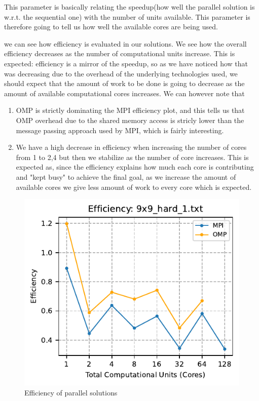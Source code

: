 This parameter is basically relating the speedup(how well the parallel solution is w.r.t. the sequential one) with the number of units available. This parameter is therefore going to tell us how well the available cores are being used.

 we can see how efficiency is evaluated in our solutions. We see how the overall efficiency decreases as the number of computational units increase. This is expected: efficiency is a mirror of the speedup, so as we have noticed how that was decreasing due to the overhead of the underlying technologies used, we should expect that the amount of work to be done is going to decrease as the amount of available computational cores increases. We can however note that 
\begin{enumerate}
    \item OMP is strictly dominating the MPI efficiency plot, and this tells us that OMP overhead due to the shared memory access is stricly lower than the message passing approach used by MPI, which is fairly interesting. 
    \item We have a high decrease in efficiency when increasing the number of cores from 1 to 2,4 but then we stabilize as the number of core increases. This is expected as, since the efficiency explains how much each core is contributing and "kept busy" to achieve the final goal, as we increase the amount of available cores we give less amount of work to every core which is expected.
\end{enumerate}

\begin{figure}[htbp]
\centering
\includegraphics[width=0.9\linewidth]{imgs/comparison_efficiency_9x9_hard_1.pdf}
\caption{Efficiency of parallel solutions}
\label{fig:efficiency_9x9}
\end{figure}




